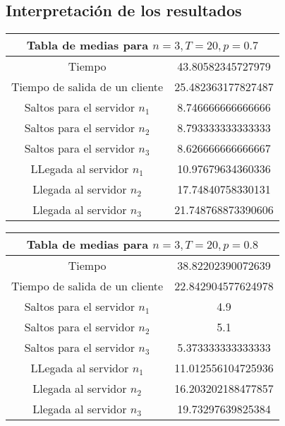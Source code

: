 \documentclass{article}
\begin{document}
\subsection{Interpretación de los resultados}
\begin{table}[h]
\centering
\begin{tabular}{|c|c|}
\hline
\multicolumn{2}{|c|}{\textbf{Tabla de medias para $n=3,T=20,p=0.7$}} \\
\hline
Tiempo & 43.80582345727979\\
\hline
Tiempo de salida de un cliente & 25.482363177827487\\
\hline
Saltos para el servidor $n_1$ & 8.746666666666666\\
\hline
Saltos para el servidor $n_2$ & 8.793333333333333\\
\hline
Saltos para el servidor $n_3$ & 8.626666666666667\\
\hline
LLegada al servidor $n_1$ & 10.97679634360336\\
\hline
Llegada al servidor $n_2$ & 17.74840758330131\\
\hline
Llegada al servidor $n_3$ & 21.748768873390606\\
\hline
\end{tabular}
\label{tabla:ejemplo}
\end{table}

\begin{table}[h]
\centering
\begin{tabular}{|c|c|}
\hline
\multicolumn{2}{|c|}{\textbf{Tabla de medias para $n=3,T=20,p=0.8$}} \\
\hline
Tiempo & 38.82202390072639\\
\hline
Tiempo de salida de un cliente & 22.842904577624978\\
\hline
Saltos para el servidor $n_1$ & 4.9\\
\hline
Saltos para el servidor $n_2$ & 5.1\\
\hline
Saltos para el servidor $n_3$ & 5.373333333333333\\
\hline
LLegada al servidor $n_1$ & 11.012556104725936\\
\hline
Llegada al servidor $n_2$ & 16.203202188477857\\
\hline
Llegada al servidor $n_3$ & 19.73297639825384\\
\hline
\end{tabular}
\label{tabla:ejemplo}
\end{table}
\end{document}
